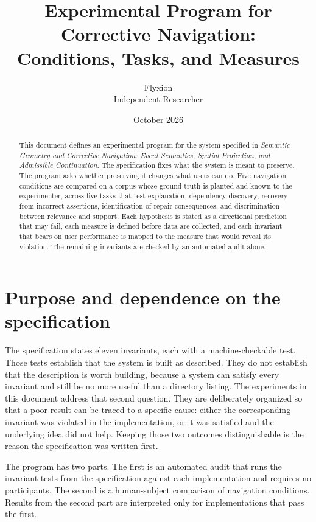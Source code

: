 \documentclass[11pt]{article}
\title{Experimental Program for Corrective Navigation:\\
Conditions, Tasks, and Measures}
\author{Flyxion\\Independent Researcher}
\date{October 2026}
\theoremstyle{definition}
\begin{document}
\maketitle

\begin{abstract}
\noindent
This document defines an experimental program for the system specified in \emph{Semantic Geometry and Corrective Navigation: Event Semantics, Spatial Projection, and Admissible Continuation}. The specification fixes what the system is meant to preserve. The program asks whether preserving it changes what users can do. Five navigation conditions are compared on a corpus whose ground truth is planted and known to the experimenter, across five tasks that test explanation, dependency discovery, recovery from incorrect assertions, identification of repair consequences, and discrimination between relevance and support. Each hypothesis is stated as a directional prediction that may fail, each measure is defined before data are collected, and each invariant that bears on user performance is mapped to the measure that would reveal its violation. The remaining invariants are checked by an automated audit alone.
\end{abstract}

\section{Purpose and dependence on the specification}

The specification states eleven invariants, each with a machine-checkable test. Those tests establish that the system is built as described. They do not establish that the description is worth building, because a system can satisfy every invariant and still be no more useful than a directory listing. The experiments in this document address that second question. They are deliberately organized so that a poor result can be traced to a specific cause: either the corresponding invariant was violated in the implementation, or it was satisfied and the underlying idea did not help. Keeping those two outcomes distinguishable is the reason the specification was written first.

The program has two parts. The first is an automated audit that runs the invariant tests from the specification against each implementation and requires no participants. The second is a human-subject comparison of navigation conditions. Results from the second part are interpreted only for implementations that pass the first.
\end{document}

